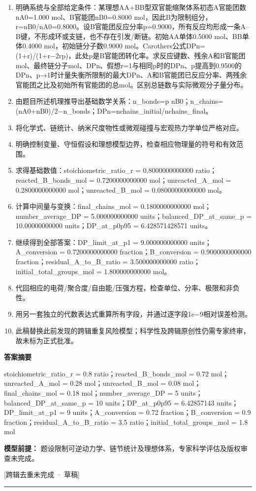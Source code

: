 \documentclass[UTF8,11pt,a4paper]{ctexart}
\begin{document}
\begin{enumerate}
\item 明确系统与全部给定条件：某理想AA+BB型双官能缩聚体系初态A官能团数nA0=1.000 mol、B官能团nB0=0.8000 mol，因此B为限制组分，r=nB0/nA0=0.8000。设B官能团反应分率p=0.9000，所有反应均形成一条A–B键，不形成环或支链，也不存在引发/断链。初始AA单体0.5000 mol、BB单体0.4000 mol，初始链分子数0.9000 mol。Carothers公式DPn=(1+r)/(1+r−2rp)，此处p是B官能团转化率。求反应键数、残余A和B官能团mol、最终链分子mol、DPn、假想r=1与相同p时的DPn、p提高到0.9500的DPn、p→1时计量失衡所限制的最大DPn、A和B官能团已反应分率、两残余官能团之比及初始所有官能团的总mol。区别总链数与实际微观分子量分布。
\item 由题目所述机理推导出基础数学关系：n\_bonds=p nB0；n\_chains=(nA0+nB0)/2−n\_bonds；DPn=nchains\_initial/nchains\_final。
\item 将化学式、链统计、纳米尺度物性或微观碰撞与宏观热力学单位严格对应。
\item 明确控制变量、守恒假设和理想模型边界，检查相应物理量的符号和有效范围。
\item 求得基础数值：stoichiometric\_ratio\_r = 0.8000000000000 ratio；reacted\_B\_bonds\_mol = 0.7200000000000 mol；unreacted\_A\_mol = 0.2800000000000 mol；unreacted\_B\_mol = 0.08000000000000 mol。
\item 计算中间量与变换：final\_chains\_mol = 0.1800000000000 mol；number\_average\_DP = 5.000000000000 units；balanced\_DP\_at\_same\_p = 10.00000000000 units；DP\_at\_p0p95 = 6.428571428571 units。
\item 继续得到全部答案：DP\_limit\_at\_p1 = 9.000000000000 units；A\_conversion = 0.7200000000000 fraction；B\_conversion = 0.9000000000000 fraction；residual\_A\_to\_B\_ratio = 3.500000000000 ratio；initial\_total\_groups\_mol = 1.800000000000 mol。
\item 代回相应的电荷/聚合度/自由能/压强方程，检查单位、分率、极限和非负性。
\item 用另一套独立的代数表达式重算所有字段，并通过逐字段1e−9相对误差检测。
\item 此稿替换此前发现的跨辑重复风险模型；科学性及跨辑原创性仍需专家终审，故未标为正式批准。
\end{enumerate}
\noindent\textbf{答案摘要}\par
stoichiometric\_ratio\_r = 0.8 ratio；reacted\_B\_bonds\_mol = 0.72 mol；unreacted\_A\_mol = 0.28 mol；unreacted\_B\_mol = 0.08 mol；final\_chains\_mol = 0.18 mol；number\_average\_DP = 5 units；balanced\_DP\_at\_same\_p = 10 units；DP\_at\_p0p95 = 6.42857143 units；DP\_limit\_at\_p1 = 9 units；A\_conversion = 0.72 fraction；B\_conversion = 0.9 fraction；residual\_A\_to\_B\_ratio = 3.5 ratio；initial\_total\_groups\_mol = 1.8 mol\par
\noindent\textbf{模型前提：}
题设限制可逆动力学、链节统计及理想体系，专家科学评估及版权审查未完成。\par
\noindent\textcolor{red!65!black}{[跨辑去重未完成 · 草稿]} \par
\medskip\hrule\medskip
{}
\end{document}
